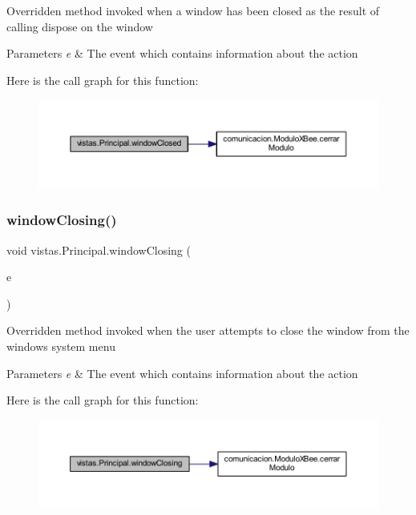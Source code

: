 Overridden method invoked when a window has been closed as the result of calling dispose on the window 
\begin{DoxyParams}{Parameters}
{\em e} & The event which contains information about the action \\
\hline
\end{DoxyParams}
Here is the call graph for this function\+:
\nopagebreak
\begin{figure}[H]
\begin{center}
\leavevmode
\includegraphics[width=350pt]{classvistas_1_1_principal_a295e5c1a87bcd4b888c76aa346aaff12_cgraph}
\end{center}
\end{figure}
\mbox{\label{classvistas_1_1_principal_a03d69d2a4a326d8d8d38434760faec6b}} 
\subsubsection{\texorpdfstring{window\+Closing()}{windowClosing()}}
{\footnotesize\ttfamily void vistas.\+Principal.\+window\+Closing (\begin{DoxyParamCaption}\item[{Window\+Event}]{e }\end{DoxyParamCaption})}

Overridden method invoked when the user attempts to close the window from the window\textquotesingle{}s system menu 
\begin{DoxyParams}{Parameters}
{\em e} & The event which contains information about the action \\
\hline
\end{DoxyParams}
Here is the call graph for this function\+:
\nopagebreak
\begin{figure}[H]
\begin{center}
\leavevmode
\includegraphics[width=350pt]{classvistas_1_1_principal_a03d69d2a4a326d8d8d38434760faec6b_cgraph}
\end{center}
\end{figure}
\mbox{\label{classvistas_1_1_principal_af96847312824430497ac7d76172f225f}} 
